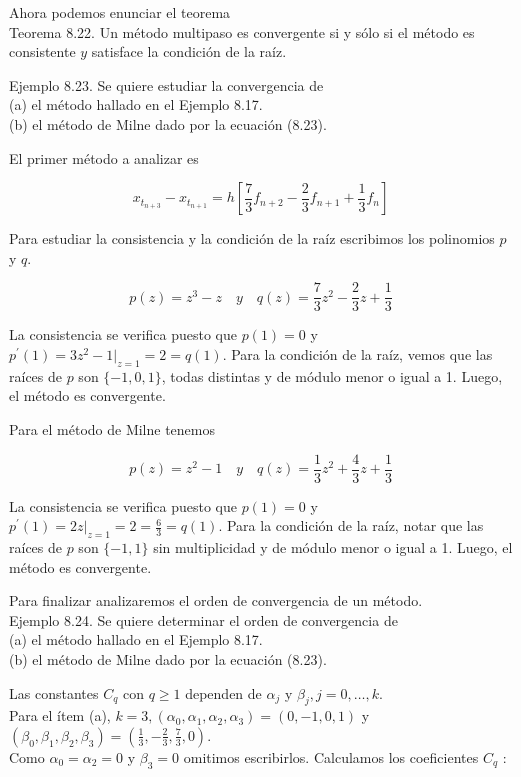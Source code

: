 \documentclass[10pt]{book}
\begin{document}
Ahora podemos enunciar el teorema\\
Teorema 8.22. Un método multipaso es convergente si y sólo si el método es consistente $y$ satisface la condición de la raíz.

Ejemplo 8.23. Se quiere estudiar la convergencia de\\
(a) el método hallado en el Ejemplo 8.17.\\
(b) el método de Milne dado por la ecuación (8.23).

El primer método a analizar es

$$
x_{t_{n+3}}-x_{t_{n+1}}=h\left[\frac{7}{3} f_{n+2}-\frac{2}{3} f_{n+1}+\frac{1}{3} f_{n}\right]
$$

Para estudiar la consistencia y la condición de la raíz escribimos los polinomios $p$ y $q$.

$$
p(z)=z^{3}-z \quad y \quad q(z)=\frac{7}{3} z^{2}-\frac{2}{3} z+\frac{1}{3}
$$

La consistencia se verifica puesto que $p(1)=0$ y $p^{\prime}(1)=3 z^{2}-\left.1\right|_{z=1}=2=q(1)$. Para la condición de la raíz, vemos que las raíces de $p$ son $\{-1,0,1\}$, todas distintas y de módulo menor o igual a 1. Luego, el método es convergente.

Para el método de Milne tenemos

$$
p(z)=z^{2}-1 \quad y \quad q(z)=\frac{1}{3} z^{2}+\frac{4}{3} z+\frac{1}{3}
$$

La consistencia se verifica puesto que $p(1)=0$ y $p^{\prime}(1)=\left.2 z\right|_{z=1}=2=\frac{6}{3}=q(1)$. Para la condición de la raíz, notar que las raíces de $p$ son $\{-1,1\}$ sin multiplicidad y de módulo menor o igual a 1. Luego, el método es convergente.

Para finalizar analizaremos el orden de convergencia de un método.\\
Ejemplo 8.24. Se quiere determinar el orden de convergencia de\\
(a) el método hallado en el Ejemplo 8.17.\\
(b) el método de Milne dado por la ecuación (8.23).

Las constantes $C_{q}$ con $q \geq 1$ dependen de $\alpha_{j}$ y $\beta_{j}, j=0, \ldots, k$.\\
Para el ítem (a), $k=3,\left(\alpha_{0}, \alpha_{1}, \alpha_{2}, \alpha_{3}\right)=(0,-1,0,1)$ y $\left(\beta_{0}, \beta_{1}, \beta_{2}, \beta_{3}\right)=\left(\frac{1}{3},-\frac{2}{3}, \frac{7}{3}, 0\right)$.\\
Como $\alpha_{0}=\alpha_{2}=0$ y $\beta_{3}=0$ omitimos escribirlos. Calculamos los coeficientes $C_{q}$ :
\end{document}
